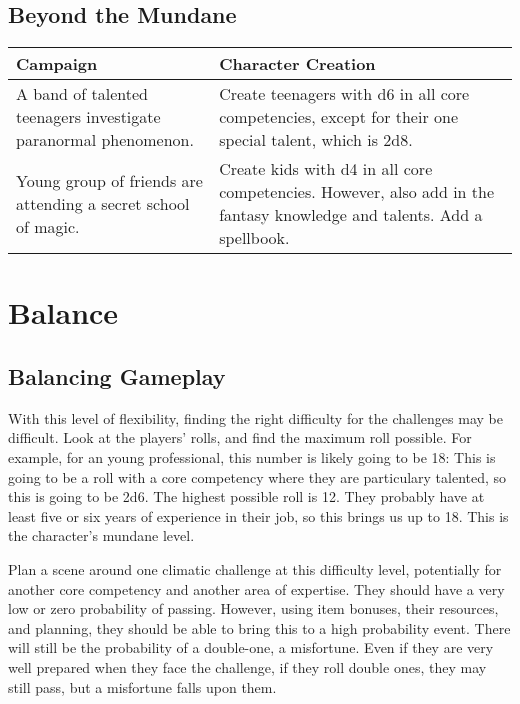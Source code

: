 \documentclass{LegrandOrangeTufteBook}
\newcommand{\term}[1]{\textcolor{colorTerm}{#1}}
\begin{document}
\subsection*{Beyond the Mundane}
\begin{center}
	\begin{xltabular}{\textwidth}{XX}
		Campaign & Character Creation \\
		\hline
{}    A band of talented teenagers investigate paranormal phenomenon. & Create teenagers with d6 in all \term{core competencies}, except for their one special talent, which is 2d8.\\
   				Young group of friends are attending a secret school of magic. & Create kids with d4 in all \term{core competencies}. However, also add in the fantasy knowledge and talents. Add a spellbook. \\

	\end{xltabular}
\end{center}

\section*{Balance}

\subsection*{Balancing Gameplay}

With this level of flexibility, finding the right difficulty for the challenges may be difficult. Look at the players' rolls, and find the maximum roll possible. For example, for an young professional,
this number is likely going to be 18: This is going to be a roll with a \term{core competency} where they are particulary talented, so this is going to be 2d6. The highest possible roll is 12. They probably have at least five or six years of experience in their job, so this brings us up to 18. This is the character's \term{mundane level}.

Plan a scene around one climatic challenge at this \term{difficulty level}, potentially for another \term{core competency} and another area of \term{expertise}. They should have a very low or zero probability of passing. However, using item bonuses, their \term{resources}, and planning, they should be able to bring this to a high probability event. There will still be the probability of a double-one, a \term{misfortune}. Even if they are very well prepared when they face the challenge, if they roll double ones, they may still pass, but a misfortune falls upon them.
\end{document}
